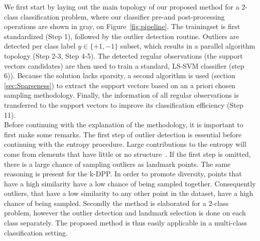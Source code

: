 \documentclass[preprint,12pt]{elsarticle}
\begin{document}
	We first start by laying out the main topology of our proposed method for a 2-class classification problem, where our classifier pre-and post-processing operations are shown in gray, on Figure~\ref{fig:pipeline}. The trainingset is first standardized (Step 1), followed by the outlier detection routine. Outliers are detected per class label $y \in \{+1, -1\}$ subset, which results in a parallel algorithm topology (Step 2-3, Step 4-5).
	 The detected regular observations (the support vectors candidates) are then used to train a standard, LS-SVM classifier (step 6)). Because the solution lacks sparsity, a second algorithm is used (section \ref{sec:Sparseness}) to extract the support vectors based on an a priori chosen sampling methodology. Finally, the information of all regular observations is transferred to the support vectors to improve its classification efficiency (Step 11). \\
Before continuing with the explanation of the methodology, it is important to first make some remarks. The first step of outlier detection is essential before continuing with the entropy procedure. Large contributions to the entropy will come from elements that have little or no structure~\cite{girolami2002orthogonal}. If the first step is omitted, there is a large chance of sampling outliers as landmark points. The same reasoning is present for the k-DPP. In order to promote diversity, points that have a high similarity have a low chance of being sampled together. Consequently outliers, that have a low similarity to any other point in the dataset, have a high chance of being sampled. Secondly the method is elaborated for a 2-class problem, however the outlier detection and landmark selection is done on each class separately. The proposed method is thus easily applicable in a multi-class classification setting. 
	
\end{document}
